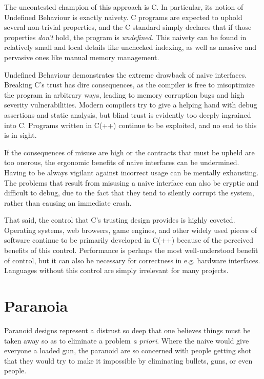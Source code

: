 The uncontested champion of this approach is C. In particular, its notion of
Undefined Behaviour is exactly naivety. C programs are expected to uphold
several non-trivial properties, and the C standard simply declares that if those
properties \emph{don't} hold, the program is \emph{undefined}. This naivety can be found in
relatively small and local details like unchecked indexing, as well as massive
and pervasive ones like manual memory management.

Undefined Behaviour demonstrates the extreme drawback of naive interfaces.
Breaking C's trust has dire consequences, as the compiler is free to misoptimize
the program in arbitrary ways, leading to memory corruption bugs and high
severity vulnerabilities. Modern compilers try to give a helping hand with debug
assertions and static analysis, but blind trust is evidently too deeply
ingrained into C. Programs written in C(++) continue to be exploited,
and no end to this is in sight.

If the consequences of misuse are high or the contracts that must be upheld are
too onerous, the ergonomic benefits of naive interfaces can be undermined.
Having to be always vigilant against incorrect usage can be mentally exhausting.
The problems that result from misusing a naive interface can also be cryptic and
difficult to debug, due to the fact that they tend to silently corrupt the system,
rather than causing an immediate crash.

That said, the control that C's trusting design provides is highly coveted.
Operating systems, web browsers, game engines, and other widely used pieces of
software continue to be primarily developed in C(++) because of the perceived
benefits of this control. Performance is perhaps the most well-understood benefit
of control, but it can also be necessary for correctness in e.g. hardware
interfaces. Languages without this control are simply irrelevant for many projects.





\section{Paranoia}

Paranoid designs represent a distrust so deep that one believes things must be
taken away so as to eliminate a problem \emph{a priori}. Where the naive would give
everyone a loaded gun, the paranoid are so concerned with people getting shot
that they would try to make it impossible by eliminating bullets, guns, or even
people.

